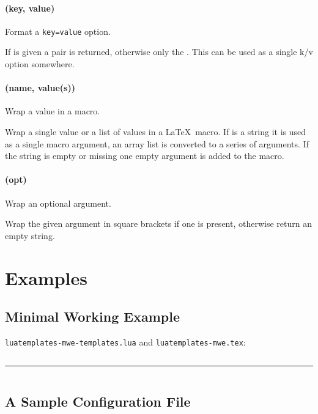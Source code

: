\documentclass{scrartcl}
\begin{document}
\paragraph{ (key, value)}

Format a \texttt{key=value} option.

If  is given a \value{key=value} pair is returned, otherwise only
the .  This can be used as a single k/v option somewhere.


\paragraph{ (name, value(s))}

Wrap a value in a macro.

Wrap a single value or a list of values in a \LaTeX\ macro. If  is
a string it is used as a single macro argument, an array list is converted to a
series of arguments. If the string is empty or missing one empty argument is
added to the macro.


\paragraph{ (opt)}

Wrap an optional argument.

Wrap the given argument in square brackets if one is present, otherwise return
an empty string.


\pagebreak
\section{Examples}
\label{sec:examples}

\subsection{Minimal Working Example}
\label{sec:mwe}

\noindent
\texttt{luatemplates-mwe-templates.lua} and \texttt{luatemplates-mwe.tex}:

\inputminted{lua}{luatemplates-mwe-templates.lua}

\hrule

\inputminted{tex}{examples/luatemplates-mwe.tex}

\pagebreak


\subsection{A Sample Configuration File}
\label{sec:basic-sample-config}
\end{document}
